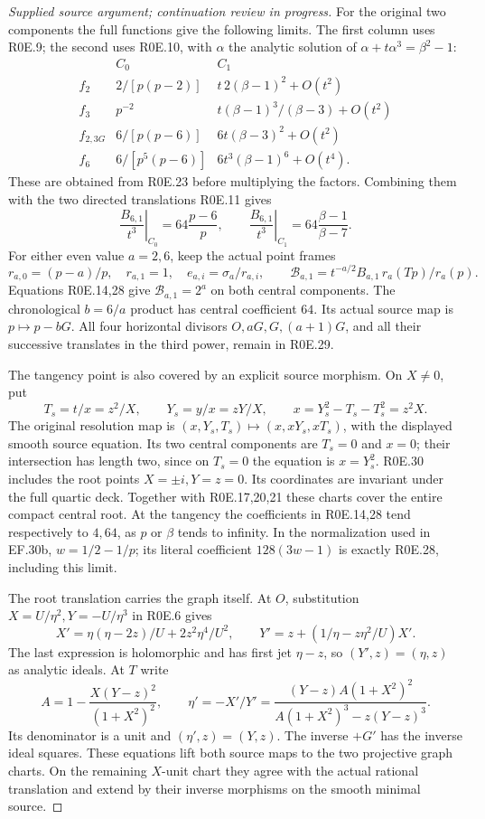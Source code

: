 \begin{proof}[Supplied source argument; continuation review in progress]
For the original two components the full functions give the following
limits. The first column uses R0E.9; the second uses R0E.10, with
\(\alpha\) the analytic solution of
\(\alpha+t\alpha^3=\beta^2-1\):
\[
\begin{array}{c|c|c}
 &C_0& C_1\\ \hline
 f_2&2/[p(p-2)]&t\,2(\beta-1)^2+O(t^2)\\
 f_3&p^{-2}&t(\beta-1)^3/(\beta-3)+O(t^2)\\
 f_{2,3G}&6/[p(p-6)]&6t(\beta-3)^2+O(t^2)\\
 f_6&6/[p^5(p-6)]&6t^3(\beta-1)^6+O(t^4).
\end{array}                                                       \tag{R0E.27}
\]
These are obtained from R0E.23 before multiplying the factors.
Combining them with the two directed translations R0E.11 gives
\[
 \left.\frac{B_{6,1}}{t^3}\right|_{C_0}
       =64\frac{p-6}{p},\qquad
 \left.\frac{B_{6,1}}{t^3}\right|_{C_1}
       =64\frac{\beta-1}{\beta-7}.
 \tag{R0E.28}
\]
For either even value \(a=2,6\), keep the actual point frames
\[
 r_{a,0}=(p-a)/p,\quad r_{a,1}=1,\quad
 e_{a,i}=\sigma_a/r_{a,i},\qquad
 \mathcal B_{a,1}=t^{-a/2}B_{a,1}\,r_a(Tp)/r_a(p).
 \tag{R0E.29}
\]
Equations R0E.14,28 give \(\mathcal B_{a,1}=2^a\) on both central
components. The chronological \(b=6/a\) product has central
coefficient \(64\). Its actual source map is \(p\mapsto p-bG\).
All four horizontal divisors \(O,aG,G,(a+1)G\), and all their
successive translates in the third power, remain in R0E.29.

The tangency point is also covered by an explicit source morphism.
On \(X\ne0\), put
\[
 T_s=t/x=z^2/X,\qquad Y_s=y/x=zY/X,\qquad
 x=Y_s^2-T_s-T_s^2=z^2X.
 \tag{R0E.30}
\]
The original resolution map is
\((x,Y_s,T_s)\mapsto(x,xY_s,xT_s)\), with the displayed smooth
source equation. Its two central components are \(T_s=0\) and
\(x=0\); their intersection has length two, since on \(T_s=0\)
the equation is \(x=Y_s^2\). R0E.30 includes the root points
\(X=\pm i,Y=z=0\). Its coordinates are invariant under the full
quartic deck. Together with R0E.17,20,21 these charts cover the
entire compact central root. At the tangency the coefficients in
R0E.14,28 tend respectively to \(4,64\), as \(p\) or \(\beta\)
tends to infinity. In the normalization used in EF.30b,
\(w=1/2-1/p\); its literal coefficient
\(128(3w-1)\) is exactly R0E.28, including this limit.

The root translation carries the graph itself. At \(O\), substitution
\(X=U/\eta^2,Y=-U/\eta^3\) in R0E.6 gives
\[
 X'=\eta(\eta-2z)/U+2z^2\eta^4/U^2,\qquad
 Y'=z+(1/\eta-z\eta^2/U)X'.
 \tag{R0E.31}
\]
The last expression is holomorphic and has first jet \(\eta-z\),
so \((Y',z)=(\eta,z)\) as analytic ideals. At \(T\) write
\[
 A=1-\frac{X(Y-z)^2}{(1+X^2)^2},\qquad
 \eta'=-X'/Y'
  =\frac{(Y-z)A(1+X^2)^2}{A(1+X^2)^3-z(Y-z)^3}.
 \tag{R0E.32}
\]
Its denominator is a unit and \((\eta',z)=(Y,z)\). The inverse
\(+G'\) has the inverse ideal squares. These equations lift both
source maps to the two projective graph charts. On the remaining
\(X\)-unit chart they agree with the actual rational translation
and extend by their inverse morphisms on the smooth minimal source.


\end{proof}
